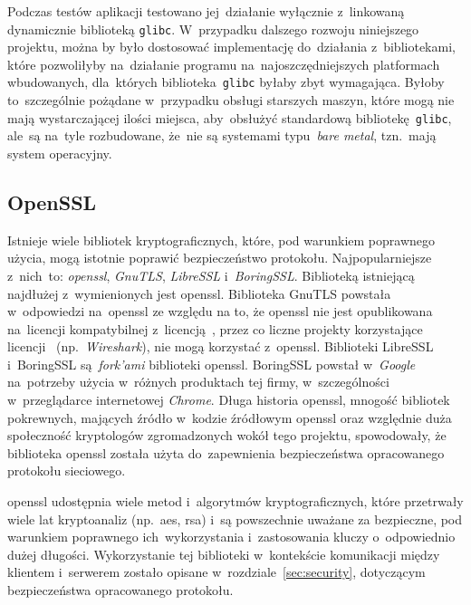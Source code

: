\documentclass[thesis]{subfiles}
\begin{document}
Podczas testów aplikacji testowano jej~działanie wyłącznie z~linkowaną dynamicznie biblioteką \texttt{glibc}. W~przypadku dalszego rozwoju niniejszego projektu, można by było dostosować implementację do~działania z~bibliotekami, które pozwoliłyby na~działanie programu na~najoszczędniejszych platformach wbudowanych, dla~których biblioteka~\texttt{glibc} byłaby zbyt wymagająca. Byłoby to~szczególnie pożądane w~przypadku obsługi starszych maszyn, które mogą nie mają wystarczającej ilości miejsca, aby~obsłużyć standardową bibliotekę~\texttt{glibc}, ale~są na~tyle rozbudowane, że~nie są systemami typu~\emph{bare metal}, tzn.~mają system operacyjny.


\subsection{OpenSSL}

Istnieje wiele bibliotek kryptograficznych, które, pod warunkiem poprawnego użycia, mogą istotnie poprawić bezpieczeństwo protokołu. Najpopularniejsze z~nich~to: \emph{\gls{openssl}}, \emph{GnuTLS}, \emph{LibreSSL} i~\emph{BoringSSL}. Biblioteką istniejącą najdłużej z~wymienionych jest \gls{openssl}. Biblioteka GnuTLS powstała w~odpowiedzi na~\gls{openssl} ze względu na to, że \gls{openssl} nie jest opublikowana na~licencji kompatybilnej z~licencją~, przez co liczne projekty korzystające licencji~ (np.~\emph{Wireshark}), nie mogą korzystać z~\gls{openssl}. Biblioteki LibreSSL i~BoringSSL są~\emph{fork'ami} biblioteki \gls{openssl}. BoringSSL powstał w~\emph{Google} na~potrzeby użycia w~różnych produktach tej firmy, w~szczególności w~przeglądarce internetowej \emph{Chrome}. Długa historia \gls{openssl}, mnogość bibliotek pokrewnych, mających źródło w~kodzie źródłowym \gls{openssl} oraz względnie duża społeczność kryptologów zgromadzonych wokół tego projektu, spowodowały, że biblioteka \gls{openssl} została użyta do~zapewnienia bezpieczeństwa opracowanego protokołu sieciowego.

\gls{openssl} udostępnia wiele metod i~algorytmów kryptograficznych, które przetrwały wiele lat kryptoanaliz (np.~\gls{aes}, \gls{rsa}) i~są powszechnie uważane za bezpieczne, pod warunkiem poprawnego ich~wykorzystania i~zastosowania kluczy o~odpowiednio dużej długości. Wykorzystanie tej biblioteki w~kontekście komunikacji między klientem i~serwerem zostało opisane w~rozdziale~\ref{sec:security}, dotyczącym bezpieczeństwa opracowanego protokołu.
\end{document}
